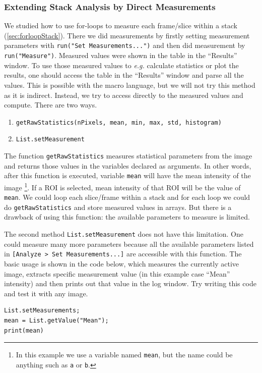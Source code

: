 \documentclass[11pt,a4paper,oneside]{report}
\newcommand{\ilcom}[1]{\texttt{\small#1}}
\begin{document}
\subsubsection{Extending Stack Analysis by Direct Measurements}

We studied how to use for-loops to measure each frame/slice within a stack (\ref{sec:forloopStack}). There we did measurements by firstly setting measurement parameters with \ilcom{run("Set Measurements...")} and then did measurement by \ilcom{run("Measure")}. Measured values were shown in the table in the ``Results'' window. To use those measured values to \textit{e.g.} calculate statistics or plot the results, one should access the table in the ``Results'' window and parse all the values. This is possible with the macro language, but we will not try this method as it is indirect. Instead, we try to access directly to the measured values and compute. There are two ways. 

\begin{enumerate}
\item \ilcom{getRawStatistics(nPixels, mean, min, max, std, histogram)}
\item \ilcom{List.setMeasurement}
\end{enumerate}
The function \ilcom{getRawStatistics} measures statistical parameters from the image and returns those values in the variables declared as arguments. In other words, after this function is executed, variable \ilcom{mean} will have the mean intensity of the image
\footnote{In this example we use a variable named \ilcom{mean}, but the name could be anything such as \ilcom{a} or \ilcom{b}.}. 
If a ROI is selected, mean intensity of that ROI will be the value of \ilcom{mean}. We could loop each slice/frame within a stack and for each loop we could do \ilcom{getRawStatistics} and store measured values in arrays. But there is a drawback of using this function: the available parameters to measure is limited. 

The second method \ilcom{List.setMeasurement} does not have this limitation. One could measure many more parameters because all the available parameters listed in \ilcom{[Analyze > Set Measurements...]} are accessible with this function. The basic usage is shown in the code below, which measures the currently active image, extracts specific measurement value (in this example case ``Mean'' intensity) and then prints out that value in the log window. Try writing this code and test it with any image. 

\begin{lstlisting}
List.setMeasurements;
mean = List.getValue("Mean");
print(mean)
\end{lstlisting}
\end{document}
